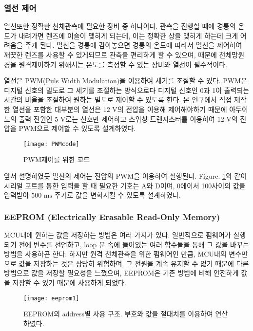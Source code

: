 \subsubsection{열선 제어}
열선또한 정확한 천체관측에 필요한 장비 중 하나이다. 관측을 진행할 때에 경통의 온도가 내려가면 렌즈에 이슬이 맺히게 되는데, 이는 정확한 상을 맺히게 하는데 크게 어려움을 주게 된다. 열선을 경통에 감아놓으면 경통의 온도에 따라서 열선을 제어하여 깨끗한 렌즈를 사용할 수 있게되므로 관측을 편리하게 할 수 있으며, 때문에 천체망원경을 원격제어하기 위해서는 온도를 측정할 수 있는 장비와 열선이 필수적이다. 

열선은 PWM(Puls Width Modulation)을 이용하여 세기를 조절할 수 있다. PWM은 디지털 신호의 밀도로 그 세기를 조절하는 방식으로다 디지털 신호인 0과 1이 출력되는 시간의 비율을 조절하여 원하는 밀도로 제어할 수 있도록 한다. 본 연구에서 직접 제작한 열선을 포함한 대부분의 열선은 $12 \textrm{ V}$의 전압을 이용해 제어해야하기 때문에 아두이노의 출력 전원인 $ 5 \textrm{ V}$로는 신호만 제어하고 스위칭 트랜지스터를 이용하여 $12 \textrm{ V}$의 전압을 PWM으로 제어할 수 있도록 설계하였다.


\begin{figure}[ht]
	\begin{center}
		\texttt{[image: PWMcode]}
	\end{center}
	\caption{PWM제어를 위한 코드}
	\label{PWM}
\end{figure}


앞서 설명하였듯 열선의 제어는 전압의 PWM을 이용하여 실행된다. \textrm{Figure}. \ref{PWM}와 같이 시리얼 포트를 통한 입력을 할 때 필요한 기호는 A와 D이며, 0에이서 100사이의 값을 입력받아 $500 \textrm{ ms}$ 주기로 값을 변화시킬 수 있도록 설계하였다.

\subsubsection{EEPROM (Electrically Erasable Read-Only Memory)}

MCU내에 원하는 값을 저장하는 방법은 여러 가지가 있다. 일반적으로 펌웨어가 실행되기 전에 변수를 선언하고, loop 문 속에 들어있는 여러 함수들을 통해 그 값을 바꾸는 방법을 사용하곤 한다. 하지만 원격 천체관측을 위한 펌웨어인 만큼, MCU내의 변수만으로 값을 저장하는 것은 상당히 위험하며, 그 전원을 계속 유지할 수 없기 때문에 다른 방법으로 값을 저장할 필요성을 느꼈으며, EEPROM은 기존 방법에 비해 안전하게 값을 저장할 수 있기 때문에 사용하게 되었다.


\begin{figure}[h]
	\begin{center}
		\texttt{[image: eeprom1]}
	\end{center}
	\caption{EEPROM의 address별 사용 구조. 부호와 값을 절대치를 이용하여 연산하였다.}
	\label{eeprom1}
\end{figure}


